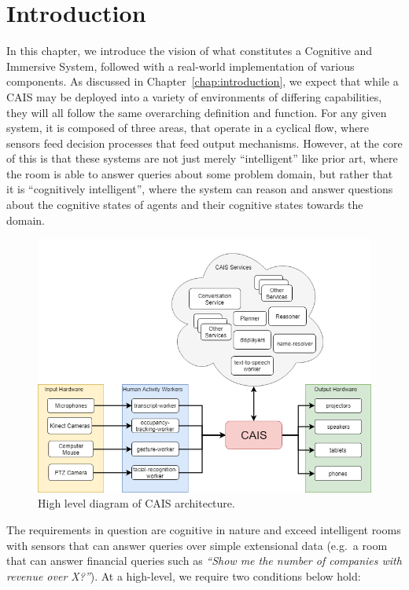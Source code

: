 \section{Introduction}

In this chapter, we introduce the vision of what constitutes a Cognitive and
Immersive System, followed with a real-world implementation of various
components. As discussed in Chapter~\ref{chap:introduction}, we expect that
while a CAIS may be deployed into a variety of environments of differing
capabilities, they will all follow the same overarching definition and function.
For any given system, it is composed of three areas, that operate in a
cyclical flow, where sensors feed decision processes that feed output mechanisms.
However, at the core of this is that these systems are not just merely ``intelligent''
like prior art, where the room is able to answer queries about some problem domain,
but rather that it is ``cognitively intelligent'', where the system can reason
and answer questions about the cognitive states of agents and their cognitive
states towards the domain.

\begin{figure}
    \centering
    \includegraphics[width=0.5\columnwidth]{chapters/02_technology/figures/cais_high_level.png}
    \caption{High level diagram of CAIS architecture.}
    \label{fig:cycle-cais}
\end{figure}

The requirements in question are cognitive in nature and exceed
intelligent rooms with sensors that can answer queries over simple
extensional data (e.g.\ a room that can answer financial queries such
as \textit{``Show me the number of companies with revenue over X?''}).
At a high-level, we require two conditions below hold:

